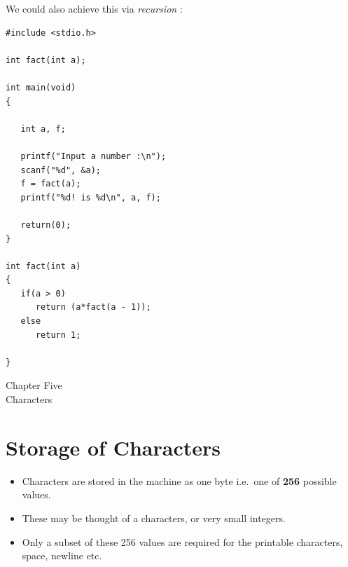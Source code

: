 \documentclass[a4,portraitt]{slides}
\begin{document}
We could also achieve this via {\it recursion} :

\newpage
{\samepage
\begin{verbatim}
#include <stdio.h>

int fact(int a);

int main(void)
{

   int a, f;

   printf("Input a number :\n");
   scanf("%d", &a);
   f = fact(a);
   printf("%d! is %d\n", a, f);

   return(0);
}

int fact(int a)
{
   if(a > 0)
      return (a*fact(a - 1));
   else
      return 1;

}
\end{verbatim}
}
\newpage
\begin{center}
{\Large Chapter Five \\ Characters}
\end{center}

\section*{Storage of Characters}

\begin{itemize}
\item Characters are stored in the machine as one byte i.e.\ one
of {\bf 256} possible values.
\item These may be thought of a characters, or very small integers.
\item Only a subset of these 256 values are required
for the printable characters, space, newline etc.
\end{itemize}
\end{document}
